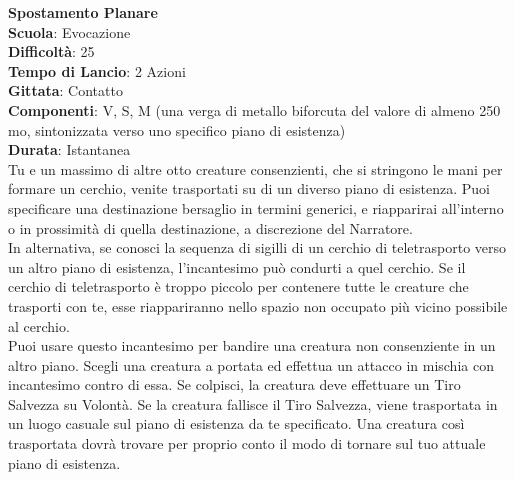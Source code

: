 \begin{multicols}{2}
\medskip\textbf{Spostamento Planare}\\
\textbf{Scuola}: Evocazione\\
\textbf{Difficoltà}:  25\\
\textbf{Tempo di Lancio}: 2 Azioni\\
\textbf{Gittata}: Contatto\\
\textbf{Componenti}: V, S, M (una verga di metallo biforcuta del valore di almeno 250 mo, sintonizzata verso uno specifico piano di esistenza)\\
\textbf{Durata}: Istantanea\\
Tu e un massimo di altre otto creature consenzienti, che si stringono le mani per formare un cerchio, venite trasportati su di un diverso piano di esistenza. Puoi specificare una destinazione bersaglio in termini generici, e riapparirai all'interno o in prossimità di quella destinazione, a discrezione del Narratore.\\
In alternativa, se conosci la sequenza di sigilli di un cerchio di teletrasporto verso un altro piano di esistenza, l'incantesimo può condurti a quel cerchio. Se il cerchio di teletrasporto è troppo piccolo per contenere tutte le creature che trasporti con te, esse riappariranno nello spazio non occupato più vicino possibile al cerchio.\\
Puoi usare questo incantesimo per bandire una creatura non consenziente in un altro piano. Scegli una creatura a portata ed effettua un attacco in mischia con incantesimo contro di essa. Se colpisci, la creatura deve effettuare un Tiro Salvezza su Volontà. Se la creatura fallisce il Tiro Salvezza, viene trasportata in un luogo casuale sul piano di esistenza da te specificato. Una creatura così trasportata dovrà trovare per proprio conto il modo di tornare sul tuo attuale piano di esistenza.


\end{multicols}
